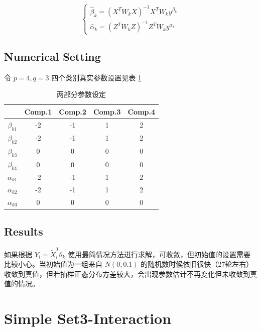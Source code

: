 \documentclass[12pt, a4paper, oneside]{article}
\numberwithin{equation}{section}
\begin{document}
\begin{equation}
	\left\{\begin{array}{l}
		\hat{\beta}_{k}=  (X^{T} W_k X)^{-1} X^{T} W_k y^{\beta_k}\\
		\hat{\alpha}_{k}= (Z^T W_k Z)^{-1}Z^T W_k y^{\alpha_k}
	\end{array}\right.
	\label{eq:two-part2}
\end{equation}

\subsection{Numerical Setting}

令 $p=4,q=3$ 四个类别真实参数设置见表 \ref{tb:coef_true_twopart}

\begin{table}[h]
	\centering
	\caption{两部分参数设定}
	\begin{tabular}{ccccc}
		\toprule
		& Comp.1 & Comp.2 & Comp.3 & Comp.4 \\
		\midrule
		$\beta_{k1}$  & -2      & -1      & 1      & 2     \\
		$\beta_{k2}$  & -2      & -1      & 1      & 2     \\
		$\beta_{k3}$  & 0      & 0      & 0      & 0      \\
		$\beta_{k4}$  & 0      & 0      & 0      & 0      \\
		$\alpha_{k1}$  & -2      & -1      & 1      & 2      \\
		$\alpha_{k2}$  & -2      & -1      & 1      & 2      \\
		$\alpha_{k3}$  & 0      & 0      & 0      & 0      \\
		\bottomrule
	\end{tabular}
	\label{tb:coef_true_twopart}
\end{table}

\subsection{Results}

如果根据 $Y_i = \tilde X_i^T\theta_k$ 使用最简情况方法进行求解，可收敛，但初始值的设置需要比较小心。当初始值为一组来自 $N(0,0.1)$ 的随机数时候依旧很快（27轮左右）收敛到真值，但若抽样正态分布方差较大，会出现参数估计不再变化但未收敛到真值的情况。



\section{Simple Set3-Interaction}
\end{document}
